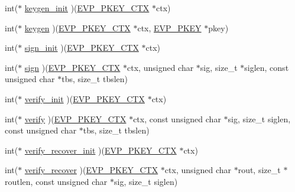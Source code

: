 \begin{DoxyCompactItemize}
\item 
int($\ast$ \hyperlink{structevp__pkey__method__st_a4033d8ed5780379caf8eff1ac339a767}{keygen\+\_\+init} )(\hyperlink{crypto_2ossl__typ_8h_aaadbb75633e4460a52864970a3b875de}{E\+V\+P\+\_\+\+P\+K\+E\+Y\+\_\+\+C\+TX} $\ast$ctx)
\item 
int($\ast$ \hyperlink{structevp__pkey__method__st_a4ce74ddc8b8f9d69e3e500756a7d2bc5}{keygen} )(\hyperlink{crypto_2ossl__typ_8h_aaadbb75633e4460a52864970a3b875de}{E\+V\+P\+\_\+\+P\+K\+E\+Y\+\_\+\+C\+TX} $\ast$ctx, \hyperlink{crypto_2ossl__typ_8h_a2fca4fef9e4c7a2a739b1ea04acb56ce}{E\+V\+P\+\_\+\+P\+K\+EY} $\ast$pkey)
\item 
int($\ast$ \hyperlink{structevp__pkey__method__st_ac2febe6e7261ac394df830c3c67bc5e7}{sign\+\_\+init} )(\hyperlink{crypto_2ossl__typ_8h_aaadbb75633e4460a52864970a3b875de}{E\+V\+P\+\_\+\+P\+K\+E\+Y\+\_\+\+C\+TX} $\ast$ctx)
\item 
int($\ast$ \hyperlink{structevp__pkey__method__st_aa11ae74da52e528fef01fe4b57412842}{sign} )(\hyperlink{crypto_2ossl__typ_8h_aaadbb75633e4460a52864970a3b875de}{E\+V\+P\+\_\+\+P\+K\+E\+Y\+\_\+\+C\+TX} $\ast$ctx, unsigned char $\ast$sig, size\+\_\+t $\ast$siglen, const unsigned char $\ast$tbs, size\+\_\+t tbslen)
\item 
int($\ast$ \hyperlink{structevp__pkey__method__st_a52c168da0ac4697f2d040515bf83e832}{verify\+\_\+init} )(\hyperlink{crypto_2ossl__typ_8h_aaadbb75633e4460a52864970a3b875de}{E\+V\+P\+\_\+\+P\+K\+E\+Y\+\_\+\+C\+TX} $\ast$ctx)
\item 
int($\ast$ \hyperlink{structevp__pkey__method__st_a4130d530978618dbcd8236e5df96bdcb}{verify} )(\hyperlink{crypto_2ossl__typ_8h_aaadbb75633e4460a52864970a3b875de}{E\+V\+P\+\_\+\+P\+K\+E\+Y\+\_\+\+C\+TX} $\ast$ctx, const unsigned char $\ast$sig, size\+\_\+t siglen, const unsigned char $\ast$tbs, size\+\_\+t tbslen)
\item 
int($\ast$ \hyperlink{structevp__pkey__method__st_a5fd28dac772d0a8ebcbf136e4c56f836}{verify\+\_\+recover\+\_\+init} )(\hyperlink{crypto_2ossl__typ_8h_aaadbb75633e4460a52864970a3b875de}{E\+V\+P\+\_\+\+P\+K\+E\+Y\+\_\+\+C\+TX} $\ast$ctx)
\item 
int($\ast$ \hyperlink{structevp__pkey__method__st_a4827337053bddadd971e6eb8dd0adf00}{verify\+\_\+recover} )(\hyperlink{crypto_2ossl__typ_8h_aaadbb75633e4460a52864970a3b875de}{E\+V\+P\+\_\+\+P\+K\+E\+Y\+\_\+\+C\+TX} $\ast$ctx, unsigned char $\ast$rout, size\+\_\+t $\ast$routlen, const unsigned char $\ast$sig, size\+\_\+t siglen)
\item 

\end{DoxyCompactItemize}
